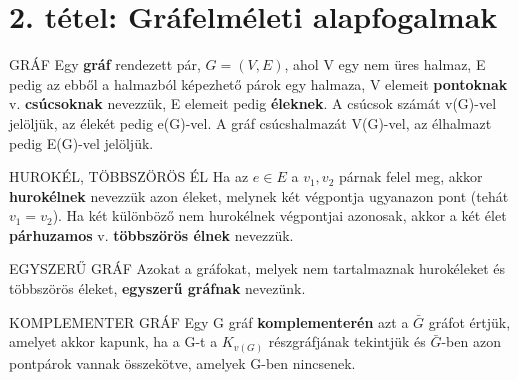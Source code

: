 \section{2. tétel: Gráfelméleti alapfogalmak}


\begin{definicio}{GRÁF}
Egy \textbf{gráf} rendezett pár, $G = (V,E)$, ahol V egy nem üres halmaz, E pedig az ebből a halmazból képezhető párok egy halmaza, V elemeit \textbf{pontoknak} v. \textbf{csúcsoknak} nevezzük, E elemeit pedig \textbf{éleknek}. A csúcsok számát v(G)-vel jelöljük, az élekét pedig e(G)-vel. A gráf csúcshalmazát V(G)-vel, az élhalmazt pedig E(G)-vel jelöljük.
\end{definicio}

\begin{definicio}{HUROKÉL, TÖBBSZÖRÖS ÉL}
Ha az $e \in E$ a {$v_1, v_2$} párnak felel meg, akkor \textbf{hurokélnek} nevezzük azon éleket, melynek két végpontja ugyanazon pont (tehát $v_1 = v_2$). Ha két különböző nem hurokélnek végpontjai azonosak, akkor a két élet \textbf{párhuzamos} v. \textbf{többszörös élnek} nevezzük.
\end{definicio}

\begin{definicio}{EGYSZERŰ GRÁF}
Azokat a gráfokat, melyek nem tartalmaznak hurokéleket és többszörös éleket, \textbf{egyszerű gráfnak} nevezünk.
\end{definicio}



\begin{definicio}{KOMPLEMENTER GRÁF}
Egy G gráf \textbf{komplementerén} azt a $\bar{G}$ gráfot értjük, amelyet akkor kapunk, ha a G-t a $K_{v(G)}$ részgráfjának tekintjük és $\bar{G}$-ben azon pontpárok vannak összekötve, amelyek G-ben nincsenek.
\end{definicio}

